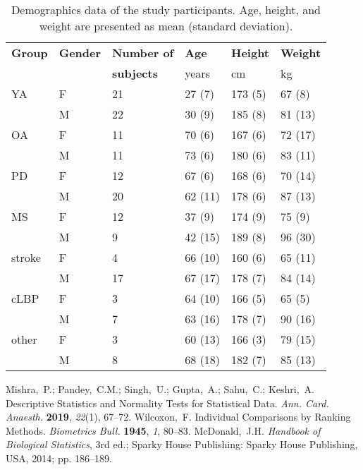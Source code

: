 \begin{table}[H] 
	\caption{\label{tab:demographics_data}Demographics data of the study participants. Age, height, and weight are presented as mean (standard deviation).}
	\begin{tabularx}{\textwidth}{CCCCCC}
		\toprule
		\textbf{Group}	& \textbf{Gender}	& \textbf{Number of}	& \textbf{Age}	& \textbf{Height}	& \textbf{Weight}\\
		 & & \textbf{subjects} & years	& cm	& kg\\
		\midrule
		YA		& F		& 21	& 27 (7)	& 173 (5)	& 67 (8)\\
		 & M	& 22	& 30 (9)	& 185 (8) & 81 (13)\\ 
		\midrule
		OA		& F		& 11	& 70 (6)	& 167 (6)	& 72 (17)\\
		 & M	& 11	& 73 (6)	& 180 (6) & 83 (11)\\
		\midrule
		PD		& F		& 12	& 67 (6)	& 168 (6)	& 70 (14)\\
		 & M	& 20	& 62 (11)	& 178 (6) & 87 (13)\\
		\midrule
		MS		& F		& 12	& 37 (9)	& 174 (9)	& 75 (9)\\
		 & M	& 9	& 42 (15)	& 189 (8) & 96 (30)\\
		\midrule
		stroke	& F		& 4	& 66 (10)	& 160 (6)	& 65 (11)\\
		 & M	& 17	& 67 (17)	& 178 (7) & 84 (14)\\
		\midrule
		cLBP	& F		& 3	& 64 (10)	& 166 (5)	& 65 (5)\\
		 & M	& 7	& 63 (16)	& 178 (7) & 90 (16)\\ 
		\midrule
		other	& F		& 3	& 60 (13)	& 166 (3)	& 79 (15)\\
		 & M	& 8	& 68 (18)	& 182 (7) & 85 (13)\\ 
		\bottomrule
	\end{tabularx}
\end{table}

Mishra,~P.; Pandey,~C.M.; Singh,~U.; Gupta,~A.; Sahu,~C.; Keshri,~A. Descriptive Statistics and Normality Tests for Statistical Data. {\em Ann. Card. Anaesth.} {\bf 2019}, {\em 22}(1), 67--72. 	
Wilcoxon,~F. Individual Comparisons by Ranking Methods. {\em Biometrics Bull.} {\bf 1945}, {\em 1}, 80--83.
McDonald,~J.H. \textit{Handbook of Biological Statistics}, 3rd ed.; Sparky House Publishing: Sparky House Publishing, USA, 2014; pp. 186--189.